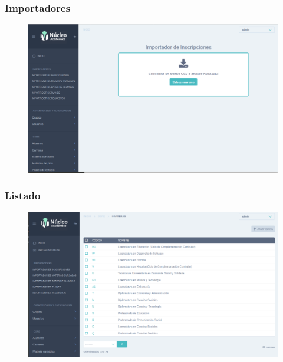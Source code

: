 \subsubsection{Importadores}
\begin{figure}[h!]
  \centering
    \includegraphics[scale=0.3]{images/nucleo/nucleo-importador.png}
  \label{fig:nucleo-importador}
\end{figure}

\subsubsection{Listado}
\begin{figure}[h!]
  \centering
    \includegraphics[scale=0.3]{images/nucleo/nucleo-list.png}
  \label{fig:nucleo-listado}
\end{figure}


